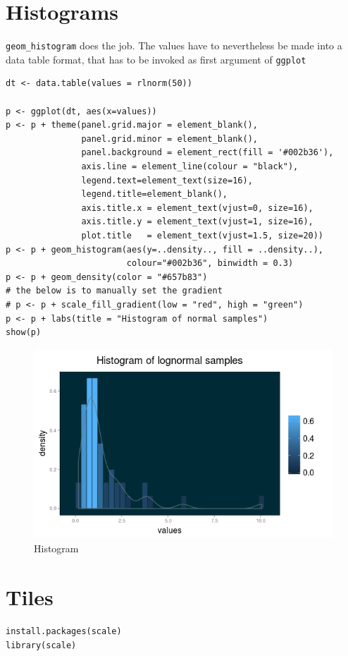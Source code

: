 \section{Histograms}
\texttt{geom\_histogram} does the job. The values 
have to nevertheless be made into a data table 
format, that has to be invoked as first argument
of \texttt{ggplot}
\begin{verbatim}
dt <- data.table(values = rlnorm(50))

p <- ggplot(dt, aes(x=values))
p <- p + theme(panel.grid.major = element_blank(), 
               panel.grid.minor = element_blank(),
               panel.background = element_rect(fill = '#002b36'),
               axis.line = element_line(colour = "black"),
               legend.text=element_text(size=16),
               legend.title=element_blank(),
               axis.title.x = element_text(vjust=0, size=16),
               axis.title.y = element_text(vjust=1, size=16),
               plot.title   = element_text(vjust=1.5, size=20)) 
p <- p + geom_histogram(aes(y=..density.., fill = ..density..), 
                        colour="#002b36", binwidth = 0.3)
p <- p + geom_density(color = "#657b83")
# the below is to manually set the gradient
# p <- p + scale_fill_gradient(low = "red", high = "green")
p <- p + labs(title = "Histogram of normal samples")
show(p) 
\end{verbatim}
\begin{figure}[htbp]
 \centering
 \includegraphics[scale = .45]{images/histogram}
 \caption*{Histogram}
\end{figure}

\section{Tiles}
\texttt{install.packages(scale)}\\
\texttt{library(scale)}
\bigskip 

